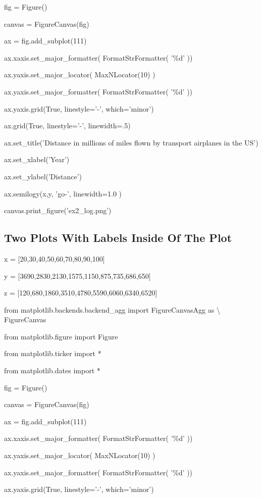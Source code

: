 \documentclass[12pt,oneside]{book}
\begin{document}
fig = Figure()

canvas = FigureCanvas(fig)

ax = fig.add\_subplot(111)

ax.xaxis.set\_major\_formatter( FormatStrFormatter(
'\%d' ))

ax.yaxis.set\_major\_locator( MaxNLocator(10) )

ax.yaxis.set\_major\_formatter( FormatStrFormatter(
'\%d' ))

ax.yaxis.grid(True, linestyle='{}-',
which='minor')

ax.grid(True, linestyle='{}-',
linewidth=.5)

ax.set\_title('Distance in millions of miles flown by
transport airplanes in the US')

ax.set\_xlabel('Year')

ax.set\_ylabel('Distance')

ax.semilogy(x,y, 'go{}-',
linewidth=1.0 )

canvas.print\_figure('ex2\_log.png')

{\textbar}


\subsection[Two Plots With Labels Inside Of The Plot]{ Two Plots With Labels Inside Of The Plot}

x = [20,30,40,50,60,70,80,90,100]

y = [3690,2830,2130,1575,1150,875,735,686,650]

z = [120,680,1860,3510,4780,5590,6060,6340,6520]


from matplotlib.backends.backend\_agg import FigureCanvasAgg as
{\textbackslash} FigureCanvas

from matplotlib.figure import Figure

from matplotlib.ticker import *

from matplotlib.dates import *

fig = Figure()

canvas = FigureCanvas(fig)

ax = fig.add\_subplot(111)

ax.xaxis.set\_major\_formatter( FormatStrFormatter(
'\%d' ))

ax.yaxis.set\_major\_locator( MaxNLocator(10) )

ax.yaxis.set\_major\_formatter( FormatStrFormatter(
'\%d' ))

ax.yaxis.grid(True, linestyle='{}-',
which='minor')
\end{document}
